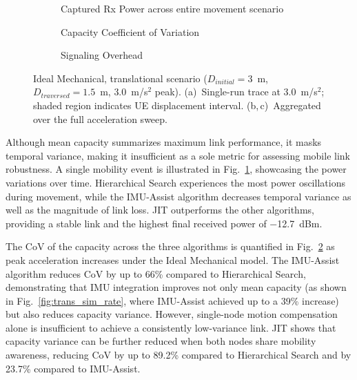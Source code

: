 \documentclass[fleqn,10pt]{wlscirep}
\begin{document}
\begin{figure}[ht!]
    \centering
    \begin{subfigure}[t]{0.475\textwidth}
        \vspace{0pt}
        \centering
        
        \vspace{-20pt}
        \caption{Captured Rx Power across entire movement scenario}
        \label{fig:trans_metrics_example}
    \end{subfigure}%
    \hfill
    \begin{minipage}[t]{0.475\textwidth}
        \vspace{0pt}
        \centering
        \begin{subfigure}{\linewidth}
            
            \vspace{-15pt}
            \caption{Capacity Coefficient of Variation}
            \label{fig:trans_metrics_covariance}
        \end{subfigure}
        \vfill
            \begin{subfigure}{\linewidth}
            
            \vspace{-15pt}
            \caption{Signaling Overhead}
            \label{fig:trans_metrics_overhead}
        \end{subfigure}
    \end{minipage}
    \caption{Ideal Mechanical, translational scenario ($D_{initial} = 3$~m, $D_{traversed} = 1.5$~m, $3.0$~m/s$^2$ peak). (a)~Single-run trace at $3.0$~m/s$^2$; shaded region indicates UE displacement interval. (b,\,c)~Aggregated over the full acceleration sweep.}
    \label{fig:translational_metrics}
    \vspace{-5pt}
\end{figure}

Although mean capacity summarizes maximum link performance, it masks temporal variance, making it insufficient as a sole metric for assessing mobile link robustness. A single mobility event is illustrated in Fig.~\ref{fig:trans_metrics_example}, showcasing the power variations over time. Hierarchical Search experiences the most power oscillations during movement, while the IMU-Assist algorithm decreases temporal variance as well as the magnitude of link loss. JIT outperforms the other algorithms, providing a stable link and the highest final received power of \SI{-12.7}{dBm}.

The CoV of the capacity across the three algorithms is quantified in Fig.~\ref{fig:trans_metrics_covariance} as peak acceleration increases under the Ideal Mechanical model. The IMU-Assist algorithm reduces CoV by up to 66\% compared to Hierarchical Search, demonstrating that IMU integration improves not only mean capacity (as shown in Fig.~\ref{fig:trans_sim_rate}, where IMU-Assist achieved up to a 39\% increase) but also reduces capacity variance. However, single-node motion compensation alone is insufficient to achieve a consistently low-variance link. JIT shows that capacity variance can be further reduced when both nodes share mobility awareness, reducing CoV by up to 89.2\% compared to Hierarchical Search and by 23.7\% compared to IMU-Assist.
\end{document}
